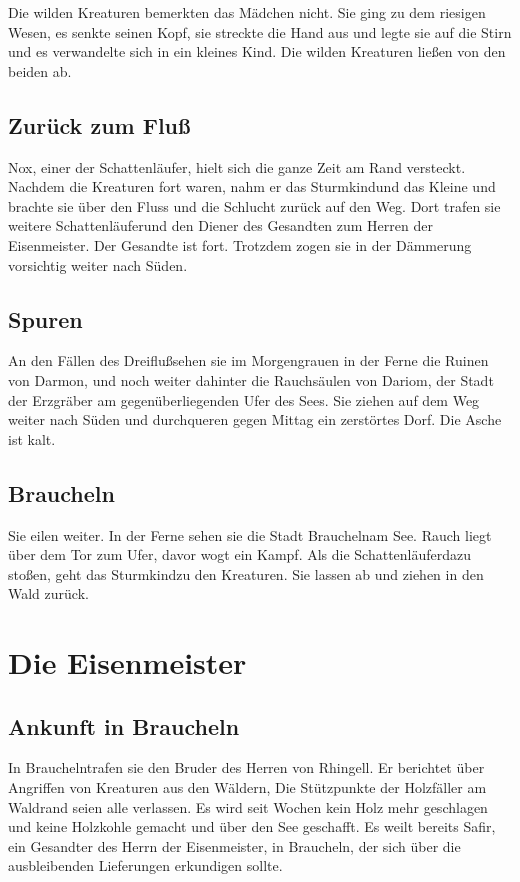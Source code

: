 \documentclass[12pt,a4paper,onecolumn,twoside,ngerman]{book}
\newcommand{\Sturmkind}{Sturmkind}
\newcommand{\Schattenjager}{Schattenläufer}
\newcommand{\Nox}{Nox}
\newcommand{\Rhingell}{Rhingell}
\newcommand{\Dreifluss}{Dreifluß}
\newcommand{\Braucheln}{Braucheln}
\newcommand{\Darmon}{Darmon}
\newcommand{\Eisenmeister}{Eisenmeister}
\newcommand{\Dariom}{Dariom}
\newcommand{\Safir}{Safir}
\begin{document}
Die wilden Kreaturen bemerkten das Mädchen nicht. Sie ging zu dem riesigen Wesen, es senkte seinen Kopf, sie streckte die Hand aus und legte sie auf die Stirn und es verwandelte sich in ein kleines Kind. Die wilden Kreaturen ließen von den beiden ab.

\section{Zurück zum Fluß}
\Nox, einer der \Schattenjager, hielt sich die ganze Zeit am Rand versteckt. Nachdem die Kreaturen fort waren, nahm er das \Sturmkind und das Kleine und brachte sie über den Fluss und die Schlucht zurück auf den Weg. Dort trafen sie weitere \Schattenjager und den Diener des Gesandten zum Herren der \Eisenmeister. Der Gesandte ist fort. Trotzdem zogen sie in der Dämmerung vorsichtig weiter nach Süden.

\section{Spuren}
An den Fällen des \Dreifluss sehen sie im Morgengrauen in der Ferne die Ruinen von \Darmon, und noch weiter dahinter die Rauchsäulen von \Dariom, der Stadt der Erzgräber am gegenüberliegenden Ufer des Sees. Sie ziehen auf dem Weg weiter nach Süden und durchqueren gegen Mittag ein zerstörtes Dorf. Die Asche ist kalt.

\section{\Braucheln}
Sie eilen weiter. In der Ferne sehen sie die Stadt \Braucheln am See. Rauch liegt über dem Tor zum Ufer, davor wogt ein Kampf. Als die \Schattenjager dazu stoßen, geht das \Sturmkind zu den Kreaturen. Sie lassen ab und ziehen in den Wald zurück.

\chapter{Die \Eisenmeister}
\section{Ankunft in \Braucheln}
In \Braucheln trafen sie den Bruder des Herren von \Rhingell. Er berichtet über Angriffen von Kreaturen aus den Wäldern, Die Stützpunkte der Holzfäller am Waldrand seien alle verlassen. Es wird seit Wochen kein Holz mehr geschlagen und keine Holzkohle gemacht und über den See geschafft. Es weilt bereits \Safir, ein Gesandter des Herrn der \Eisenmeister, in \Braucheln, der sich über die ausbleibenden Lieferungen erkundigen sollte.
\end{document}
